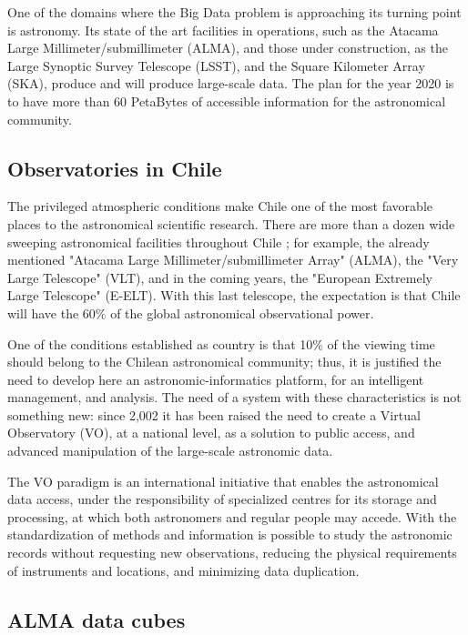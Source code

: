 \documentclass[]{spie}
\begin{document}
One of the domains where the Big Data problem is approaching its turning point
is astronomy.  Its state of the art facilities in operations, such as the
Atacama Large Millimeter/submillimeter (ALMA), and those under construction, as
the Large Synoptic Survey Telescope (LSST), and the Square Kilometer Array
(SKA), produce and will produce large-scale data.  The plan for the year 2020
is to have more than 60 PetaBytes of accessible information for the
astronomical community.

\subsection{Observatories in Chile}
\label{sec:obsinchile}
The privileged atmospheric conditions make Chile one of the most favorable
places to the astronomical scientific research.  There are more than a dozen
wide sweeping astronomical facilities throughout Chile \cite{roadmap}; for example, the
already mentioned "Atacama Large Millimeter/submillimeter Array" (ALMA), the
"Very Large Telescope" (VLT), and in the coming years, the "European Extremely
Large Telescope" (E-ELT).  With this last telescope, the expectation is that
Chile will have the 60\% of the global astronomical observational power.

One of the conditions established as country is that 10\% of the viewing time
should belong to the Chilean astronomical community; thus, it is justified the
need to develop here an astronomic-informatics platform, for an intelligent
management, and analysis.  The need of a system with these characteristics is
not something new:  since 2,002 it has been raised the need to create a Virtual
Observatory (VO), at a national level, as a solution to public access, and
advanced manipulation of the large-scale astronomic data.

The VO paradigm is an international initiative that enables the astronomical
data access, under the responsibility of specialized centres for its storage
and processing, at which both astronomers and regular people may accede.  With
the standardization of methods and information is possible to study the
astronomic records without requesting new observations, reducing the physical
requirements of instruments and locations, and minimizing data duplication.

\subsection{ALMA data cubes}
\label{sec:almadatacubes}
\end{document}
